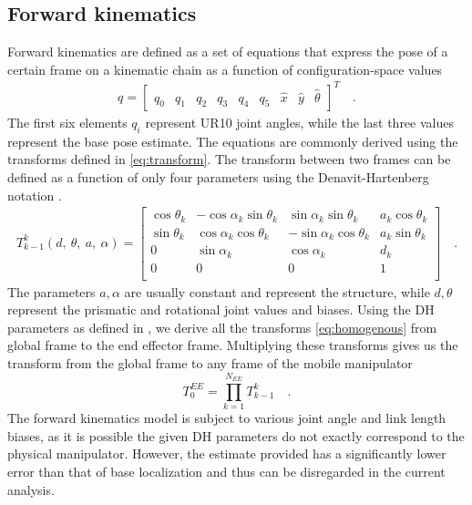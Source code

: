 \documentclass[times, utf8, diplomski, english]{fer}
\begin{document}
\subsection{Forward kinematics}\label{subsection:FK}
Forward kinematics are defined as a set of equations that express the pose of a certain frame on a kinematic chain as a function of configuration-space values
\begin{align}\label{eq:config_matrix}
q = 
\begin{bmatrix}
q_0& q_1& q_2& q_3& q_4& q_5& \hat{x}& \hat{y}& \hat{\theta}
\end{bmatrix}^T \quad .
\end{align}
The first six elements $q_i$ represent UR10 joint angles, while the last three values represent the base pose estimate.
The equations are commonly derived using the transforms defined in \eqref{eq:transform}.
The transform between two frames can be defined as a function of only four parameters using the Denavit-Hartenberg notation \citep{uicker1964iterative}.
\begin{align}
T_{k-1}^k(d, \ \theta, \ a, \ \alpha)
=
\begin{bmatrix}
\cos\theta_{k}& -\cos\alpha_{k}\sin\theta_{k} & \sin\alpha_{k}\sin\theta_{k} & a_k\cos\theta_{k}\\
\sin\theta_{k}& \cos\alpha_{k}\cos\theta_{k} & -\sin\alpha_{k}\cos\theta_{k} & a_k\sin\theta_{k}\\
0 & \sin\alpha_{k} & \cos\alpha_{k} & d_{k}\\
0 & 0 & 0 & 1\\
\end{bmatrix} \quad .
\label{eq:homogenous}
\end{align}
The parameters $a, \alpha$ are usually constant and represent the structure, while $d, \theta$ represent the prismatic and rotational joint values and biases.
Using the DH parameters as defined in , we derive all the transforms \eqref{eq:homogenous} from global frame to the end effector frame.
Multiplying these transforms gives us the transform from the global frame to any frame of the mobile manipulator
\begin{equation}
T_{0}^{EE} = \prod_{k=1}^{N_{EE}} T_{k-1}^{k} \quad .
\label{FK}
\end{equation}
The forward kinematics model is subject to various joint angle and link length biases, as it is possible the given DH parameters do not exactly correspond to the physical manipulator.
However, the estimate provided has a significantly lower error than that of base localization and thus can be disregarded in the current analysis.
\end{document}
